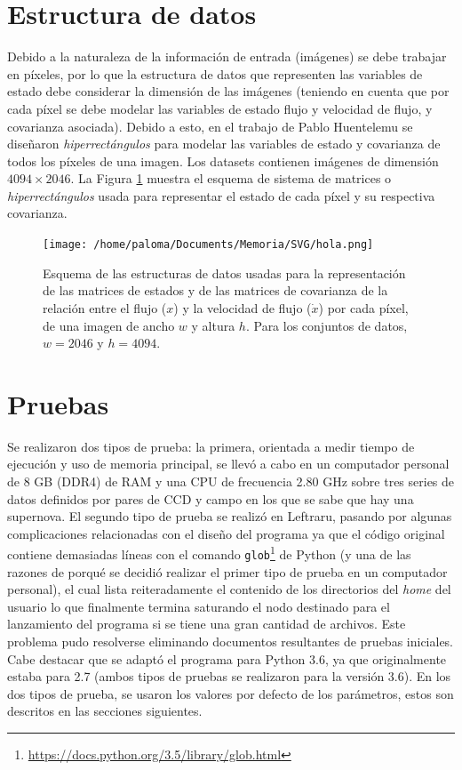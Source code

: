 \section{Estructura de datos}
\label{des:struct}
Debido a la naturaleza de la informaci\'on de entrada (im\'agenes) se debe trabajar en p\'ixeles, por lo que la estructura de datos que representen las variables de estado debe considerar la dimensi\'on de las im\'agenes (teniendo en cuenta que por cada p\'ixel se debe modelar las variables de estado flujo y velocidad de flujo, y covarianza asociada). Debido a esto, en el trabajo de Pablo Huentelemu \cite{huentelemu} se dise\~naron \textit{hiperrect\'angulos} para modelar las variables de estado y covarianza de todos los p\'ixeles de una imagen. Los datasets contienen im\'agenes de dimensi\'on  $4094 \times 2046$. La Figura \ref{fig:data_scheme} muestra el esquema de sistema de matrices o \textit{hiperrect\'angulos} usada para representar el estado de cada p\'ixel y su respectiva covarianza.
\bigskip  

\begin{figure}
\centering
\texttt{[image: /home/paloma/Documents/Memoria/SVG/hola.png]}
\caption{Esquema de las estructuras de datos usadas para la representaci\'on de las matrices de estados y de las matrices de covarianza de la relaci\'on entre el flujo ($x$) y la velocidad de flujo ($\dot{x}$) por cada p\'ixel, de una imagen de ancho $w$ y altura $h$. Para los conjuntos de datos, $w=2046$ y $h=4094$.}
\label{fig:data_scheme}
\end{figure}
\bigskip

\section{Pruebas}

Se realizaron dos tipos de prueba: la primera, orientada a medir tiempo de ejecuci\'on y uso de memoria principal, se llev\'o a cabo en un computador personal de 8 GB (DDR4) de RAM y una CPU de frecuencia 2.80 GHz sobre tres series de datos definidos por pares de CCD y campo en los que se sabe que hay una supernova. El segundo tipo de prueba se realiz\'o en Leftraru, pasando por algunas complicaciones relacionadas con el dise\~no del programa ya que el c\'odigo original contiene demasiadas l\'ineas con el comando \texttt{glob}\footnote{\url{https://docs.python.org/3.5/library/glob.html}} de Python (y una de las razones de porqu\'e se decidi\'o realizar el primer tipo de prueba en un computador personal), el cual lista reiteradamente el contenido de los directorios del \textit{home} del usuario lo que finalmente termina saturando el nodo destinado para el lanzamiento del programa si se tiene una gran cantidad de archivos. Este problema pudo resolverse eliminando documentos resultantes de pruebas iniciales. Cabe destacar que se adapt\'o el programa para Python 3.6, ya que originalmente estaba para 2.7 (ambos tipos de pruebas se realizaron para la versi\'on 3.6). En los dos tipos de prueba, se usaron los valores por defecto de los par\'ametros, estos son descritos en las secciones siguientes.
\bigskip


